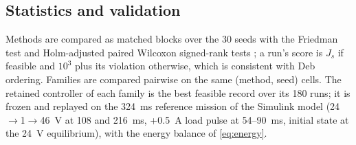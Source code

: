 \subsection{Statistics and validation}
Methods are compared as matched blocks over the 30 seeds with the Friedman test
and Holm-adjusted paired Wilcoxon signed-rank tests \citep{Demsar2006}; a run's
score is $J_s$ if feasible and $10^3$ plus its violation otherwise, which is
consistent with Deb ordering. Families are compared pairwise on the same
(method, seed) cells. The retained controller of each family is the best
feasible record over its 180 runs; it is frozen and replayed on the
\SI{324}{ms} reference mission of the Simulink model
(24$\to$1$\to$46~V at 108 and 216~ms, +0.5~A load pulse at 54--90~ms, initial
state at the \SI{24}{V} equilibrium), with the energy balance of
\eqref{eq:energy}.
